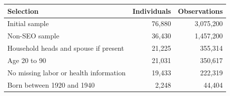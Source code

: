     \begin{tabular}{l r r} %
    \toprule
 \hline
Selection &  Individuals  & Observations\\ [0.5ex]
 \hline
 Initial sample & 76,880 & 3,075,200\\
 Non-SEO sample &  36,430 & 1,457,200\\
  Household heads and spouse if present & 21,225 & 355,314\\
   Age 20 to 90 & 21,031 & 350,617\\ 
   No missing labor or health information &19,433 &  222,319 \\
 Born between 1920 and 1940 & 2,248 & 44,404\\  [0.5ex] 
 \hline\bottomrule
    \end{tabular}
